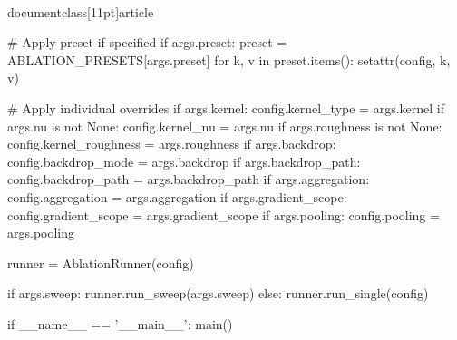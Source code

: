 \\documentclass[11pt]{article}
\begin{document}
\begin{CodeBlock}
    # Apply preset if specified
    if args.preset:
        preset = ABLATION_PRESETS[args.preset]
        for k, v in preset.items():
            setattr(config, k, v)

    # Apply individual overrides
    if args.kernel:
        config.kernel_type = args.kernel
    if args.nu is not None:
        config.kernel_nu = args.nu
    if args.roughness is not None:
        config.kernel_roughness = args.roughness
    if args.backdrop:
        config.backdrop_mode = args.backdrop
    if args.backdrop_path:
        config.backdrop_path = args.backdrop_path
    if args.aggregation:
        config.aggregation = args.aggregation
    if args.gradient_scope:
        config.gradient_scope = args.gradient_scope
    if args.pooling:
        config.pooling = args.pooling

    runner = AblationRunner(config)

    if args.sweep:
        runner.run_sweep(args.sweep)
    else:
        runner.run_single(config)


if __name__ == '__main__':
    main()

\end{CodeBlock}
\end{document}
